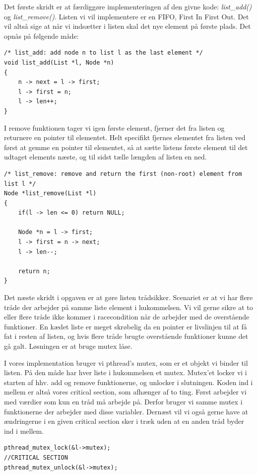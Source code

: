 \documentclass[danish]{report}
\begin{document}
Det første skridt er at færdiggøre implementeringen af den givne kode: \textit{list\_add()} og \textit{list\_remove()}. Listen vi vil implementere er en FIFO, First In First Out. Det vil altså sige at når vi indsætter i listen skal det nye element på første plads. Det opnås på følgende måde:

\begin{lstlisting}    
/* list_add: add node n to list l as the last element */
void list_add(List *l, Node *n)
{
	n -> next = l -> first;
	l -> first = n;
	l -> len++;
}
\end{lstlisting}

I remove funktionen tager vi igen første element, fjerner det fra listen og returnere en pointer til elementet. Helt specifikt fjernes elementet fra listen ved først at gemme en pointer til elementet, så at sætte listens første element til det udtaget elements næste, og til sidst tælle længden af listen en ned.

\begin{lstlisting}    
/* list_remove: remove and return the first (non-root) element from list l */
Node *list_remove(List *l)
{
	if(l -> len <= 0) return NULL;

	Node *n = l -> first;
	l -> first = n -> next;
	l -> len--;

	return n;
}
\end{lstlisting}

Det næste skridt i opgaven er at gøre listen trådsikker. Scenariet er at vi har flere tråde der arbejder på samme liste element i hukommelsen. Vi vil gerne sikre at to eller flere tråde ikke kommer i racecondition når de arbejder med de overstående funktioner. En kædet liste er meget skrøbelig da en pointer er livslinjen til at få fat i resten af listen, og hvis flere tråde brugte overstående funktioner kunne det gå galt. Løsningen er at bruge mutex låse.

I vores implementation bruger vi pthread's mutex, som er et objekt vi binder til listen. På den måde har hver liste i hukommelsen et mutex. Mutex'et locker vi i starten af hhv. add og remove funktionerne, og unlocker i slutningen. Koden ind i mellem er altså vores critical section, som afhænger af to ting. Først arbejder vi med værdier som kun en tråd må arbejde på. Derfor bruger vi samme mutex i funktionerne der arbejder med disse variabler. Dernæst vil vi også gerne have at ændringerne i en given critical section sker i træk uden at en anden tråd byder ind i mellem.


\begin{lstlisting}    
pthread_mutex_lock(&l->mutex);
//CRITICAL SECTION
pthread_mutex_unlock(&l->mutex);
\end{lstlisting}
\end{document}
